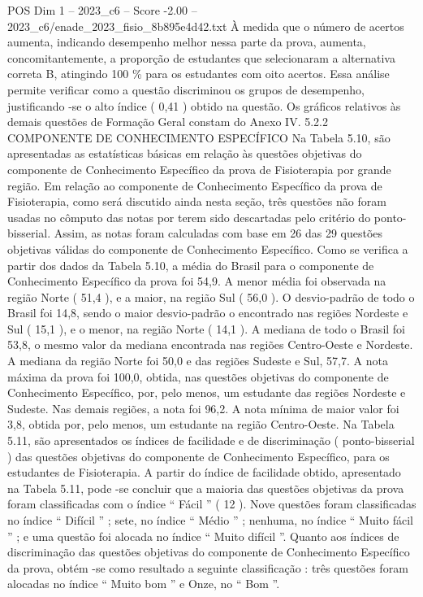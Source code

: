 \begin{textsample}{POS Dim 1 – 2023\_c6 – Score -2.00 – 2023\_c6/enade\_2023\_fisio\_8b895e4d42.txt}
À medida que o número de acertos aumenta, indicando desempenho melhor nessa parte da prova, aumenta, concomitantemente, a proporção de estudantes que selecionaram a alternativa correta B, atingindo 100 \% para os estudantes com oito acertos.
Essa análise permite verificar como a questão discriminou os grupos de desempenho, justificando -se o alto índice ( 0,41 ) obtido na questão.
Os gráficos relativos às demais questões de Formação Geral constam do Anexo IV. 5.2.2 COMPONENTE DE CONHECIMENTO ESPECÍFICO Na Tabela 5.10, são apresentadas as estatísticas básicas em relação às questões objetivas do componente de Conhecimento Específico da prova de Fisioterapia por grande região.
Em relação ao componente de Conhecimento Específico da prova de Fisioterapia, como será discutido ainda nesta seção, três questões não foram usadas no cômputo das notas por terem sido descartadas pelo critério do ponto-bisserial.
Assim, as notas foram calculadas com base em 26 das 29 questões objetivas válidas do componente de Conhecimento Específico.
Como se verifica a partir dos dados da Tabela 5.10, a média do Brasil para o componente de Conhecimento Específico da prova foi 54,9.
A menor média foi observada na região Norte ( 51,4 ), e a maior, na região Sul ( 56,0 ).
O desvio-padrão de todo o Brasil foi 14,8, sendo o maior desvio-padrão o encontrado nas regiões Nordeste e Sul ( 15,1 ), e o menor, na região Norte ( 14,1 ).
A mediana de todo o Brasil foi 53,8, o mesmo valor da mediana encontrada nas regiões Centro-Oeste e Nordeste.
A mediana da região Norte foi 50,0 e das regiões Sudeste e Sul, 57,7.
A nota máxima da prova foi 100,0, obtida, nas questões objetivas do componente de Conhecimento Específico, por, pelo menos, um estudante das regiões Nordeste e Sudeste.
Nas demais regiões, a nota foi 96,2.
A nota mínima de maior valor foi 3,8, obtida por, pelo menos, um estudante na região Centro-Oeste.
Na Tabela 5.11, são apresentados os índices de facilidade e de discriminação ( ponto-bisserial ) das questões objetivas do componente de Conhecimento Específico, para os estudantes de Fisioterapia.
A partir do índice de facilidade obtido, apresentado na Tabela 5.11, pode -se concluir que a maioria das questões objetivas da prova foram classificadas com o índice “ Fácil ” ( 12 ).
Nove questões foram classificadas no índice “ Difícil ” ; sete, no índice “ Médio ” ; nenhuma, no índice “ Muito fácil ” ; e uma questão foi alocada no índice “ Muito difícil ”.
Quanto aos índices de discriminação das questões objetivas do componente de Conhecimento Específico da prova, obtém -se como resultado a seguinte classificação : três questões foram alocadas no índice “ Muito bom ” e Onze, no “ Bom ”.

\end{textsample}
